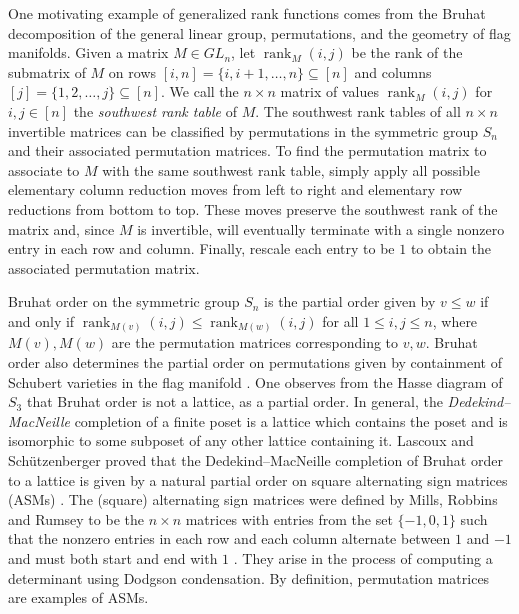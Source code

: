 \documentclass[12pt]{amsart}
\numberwithin{equation}{section}
\theoremstyle{definition}
\newcommand{\rank}{\operatorname{rank}}
\begin{document}
One motivating example of generalized rank functions comes from the
Bruhat decomposition of the general linear group, permutations, and
the geometry of flag manifolds.  Given a matrix $M \in GL_{n}$, let
$\rank_{M}(i,j)$ be the rank of the submatrix of $M$ on rows
$[i,n]=\{i,i+1,\dotsc ,n \} \subseteq [n]$ and columns
$[j]=\{1,2,\dotsc ,j \} \subseteq [n]$.  We call the $n \times n$
matrix of values $\rank_{M}(i,j)$ for $i,j\in [n]$ the
\textit{southwest rank table} of $M$.  The southwest rank tables of
all $n\times n$ invertible matrices can be classified by permutations
in the symmetric group $S_{n}$ and their associated permutation
matrices.  To find the permutation matrix to associate to $M$ with the
same southwest rank table, simply apply all possible elementary column
reduction moves from left to right and elementary row reductions from
bottom to top.  These moves preserve the southwest rank of the matrix
and, since $M$ is invertible, will eventually terminate with a single
nonzero entry in each row and column. Finally, rescale each entry to
be $1$ to obtain the associated permutation matrix.

Bruhat order on the symmetric group $S_{n}$ is the partial order given
by $v\leq w$ if and only if $\rank_{M(v)}(i,j)\leq \rank_{M(w)}(i,j)$ for all
$1\leq i,j\leq n$, where $M(v),M(w)$ are the permutation matrices corresponding
to $v,w$.  Bruhat order also determines the partial order on
permutations given by containment of Schubert varieties in the flag
manifold \cite[Ch.~9]{Fulton-book}.  One observes from the Hasse
diagram of $S_{3}$ that Bruhat order is not a lattice, as a partial
order.  In general, the \textit{Dedekind--MacNeille} completion of a
finite poset is a lattice which contains the poset and is isomorphic
to some subposet of any other lattice containing it.  Lascoux and
Sch\"utzenberger proved that the Dedekind--MacNeille completion of
Bruhat order to a lattice is given by a natural partial order on
square alternating sign matrices (ASMs)
\cite{LS-MacNeille,lascoux2008chern}.  The (square) alternating sign
matrices were defined by Mills, Robbins and Rumsey to be the $n \times
n$ matrices with entries from the set $\{-1,0,1 \}$ such that the
nonzero entries in each row and each column alternate between $1$ and
$-1$ and must both start and end with $1$
\cite{Mills-Robbins-Rumsey.ASMS,Robbins-Rumsey}. They arise in the
process of computing a determinant using Dodgson condensation.  By
definition, permutation matrices are examples of ASMs.
\end{document}
